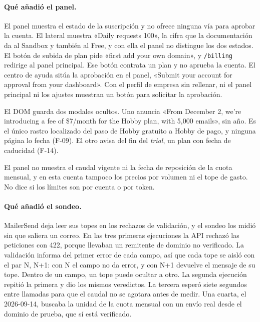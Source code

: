 \paragraph{Qué añadió el panel.}
El panel muestra el estado de la suscripción y no ofrece ninguna vía para aprobar la cuenta. El
lateral muestra «Daily requests 100», la cifra que la documentación da al Sandbox y también al Free, y con ella el panel no distingue los dos estados. El botón de subida de plan
pide «first add your own domain», y \texttt{/billing} redirige al panel principal. Ese
botón contrata un plan y no aprueba la cuenta. El centro de ayuda sitúa la aprobación
en el panel, «Submit your account for approval from your dashboard». Con el perfil de
empresa sin rellenar, ni el panel principal ni los ajustes muestran un botón para
solicitar la aprobación.

El DOM guarda dos modales ocultos. Uno anuncia «From December 2, we're introducing a
fee of \$7/month for the Hobby plan, with 5,000 emails», sin año. Es el único rastro
localizado del paso de Hobby gratuito a Hobby de pago, y ninguna página lo fecha
(F-09). El otro avisa del fin del \textit{trial}, un plan con fecha de caducidad
(F-14).

El panel no muestra el caudal vigente ni la fecha de reposición de la cuota mensual, y
en esta cuenta tampoco los precios por volumen ni el tope de gasto. No dice si los
límites son por cuenta o por token.

\paragraph{Qué añadió el sondeo.}
MailerSend deja leer sus topes en los rechazos de validación, y el sondeo los midió
sin que saliera un correo. En las tres primeras ejecuciones la API rechazó las
peticiones con 422, porque llevaban un remitente de dominio no verificado. La
validación informa del primer error de cada campo, así que cada tope se aisló con el
par N, N+1: con N el campo no da error, y con N+1 devuelve el mensaje de su tope.
Dentro de un campo, un tope puede ocultar a otro. La segunda ejecución repitió la
primera y dio los mismos veredictos. La tercera esperó siete segundos entre llamadas
para que el caudal no se agotara antes de medir. Una cuarta, el 2026-09-14, buscaba la
unidad de la cuota mensual con un envío real desde el dominio de prueba, que sí está
verificado.

